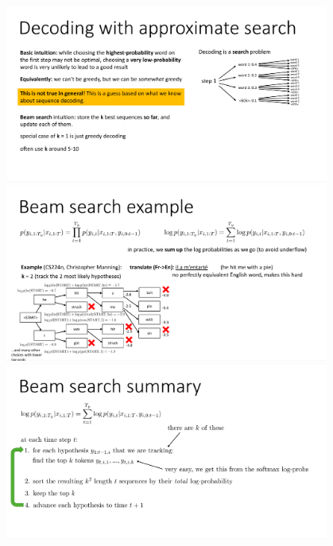 \documentclass{book}
\begin{document}
\begin{figure}[H]
    \centering
    \includegraphics[width=0.95\textwidth]{images/lec11_9.png}
    \includegraphics[width=0.95\textwidth]{images/lec11_10.png}
    \includegraphics[width=0.95\textwidth]{images/lec11_11.png}
\end{figure}
\end{document}

